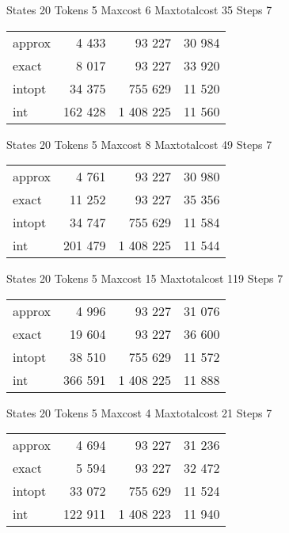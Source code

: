 \documentclass[a4paper,11pt]{article}
\begin{document}
\begin{table}
States 20 Tokens 5 Maxcost 6 Maxtotalcost 35 Steps 7 \\
\begin{tabular}{l r r r}
approx & 4 433 & 93 227 & 30 984 \\
exact & 8 017 & 93 227 & 33 920 \\
intopt & 34 375 & 755 629 & 11 520 \\
int & 162 428 & 1 408 225 & 11 560 \\
\end{tabular}
\end{table}

\begin{table}
States 20 Tokens 5 Maxcost 8 Maxtotalcost 49 Steps 7 \\
\begin{tabular}{l r r r}
approx & 4 761 & 93 227 & 30 980 \\
exact & 11 252 & 93 227 & 35 356 \\
intopt & 34 747 & 755 629 & 11 584 \\
int & 201 479 & 1 408 225 & 11 544 \\
\end{tabular}
\end{table}

\begin{table}
States 20 Tokens 5 Maxcost 15 Maxtotalcost 119 Steps 7 \\
\begin{tabular}{l r r r}
approx & 4 996 & 93 227 & 31 076 \\
exact & 19 604 & 93 227 & 36 600 \\
intopt & 38 510 & 755 629 & 11 572 \\
int & 366 591 & 1 408 225 & 11 888 \\
\end{tabular}
\end{table}

\begin{table}
States 20 Tokens 5 Maxcost 4 Maxtotalcost 21 Steps 7 \\
\begin{tabular}{l r r r}
approx & 4 694 & 93 227 & 31 236 \\
exact & 5 594 & 93 227 & 32 472 \\
intopt & 33 072 & 755 629 & 11 524 \\
int & 122 911 & 1 408 223 & 11 940 \\
\end{tabular}
\end{table}
\end{document}
